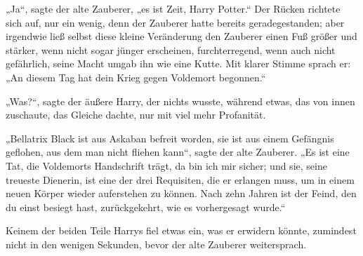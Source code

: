 „Ja“, sagte der alte Zauberer, „es ist Zeit, Harry Potter.“ Der Rücken richtete sich auf, nur ein wenig, denn der Zauberer hatte bereits geradegestanden; aber irgendwie ließ selbst diese kleine Veränderung den Zauberer einen Fuß größer und stärker, wenn nicht sogar jünger erscheinen, furchterregend, wenn auch nicht gefährlich, seine Macht umgab ihn wie eine Kutte. Mit klarer Stimme sprach er: „An diesem Tag hat dein Krieg gegen Voldemort begonnen.“

„Was?“, sagte der äußere Harry, der nichts wusste, während etwas, das von innen zuschaute, das Gleiche dachte, nur mit viel mehr Profanität.

„Bellatrix Black ist aus Askaban befreit worden, sie ist aus einem Gefängnis geflohen, aus dem man nicht fliehen kann“, sagte der alte Zauberer. „Es ist eine Tat, die Voldemorts Handschrift trägt, da bin ich mir sicher; und sie, seine treueste Dienerin, ist eine der drei Requisiten, die er erlangen muss, um in einem neuen Körper wieder auferstehen zu können. Nach zehn Jahren ist der Feind, den du einst besiegt hast, zurückgekehrt, wie es vorhergesagt wurde.“

Keinem der beiden Teile Harrys fiel etwas ein, was er erwidern könnte, zumindest nicht in den wenigen Sekunden, bevor der alte Zauberer weitersprach.

